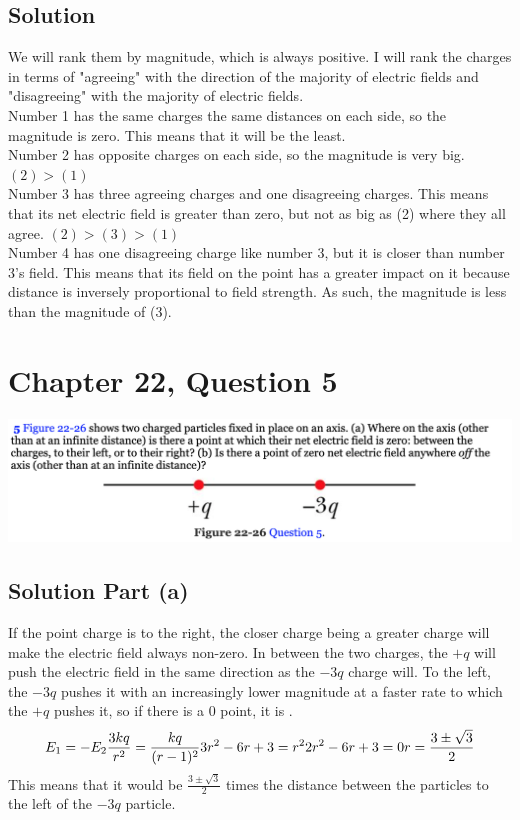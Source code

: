 \documentclass[12pt]{article}
\begin{document}
\subsection*{Solution}
We will rank them by magnitude, which is always positive. I will rank the charges in terms of "agreeing" with the direction of the majority of electric fields and "disagreeing" with the majority of electric fields.\\
Number 1 has the same charges the same distances on each side, so the magnitude is zero. This means that it will be the least.\\
Number 2 has opposite charges on each side, so the magnitude is very big. $(2) > (1)$\\
Number 3 has three agreeing charges and one disagreeing charges. This means that its net electric field is greater than zero, but not as big as (2) where they all agree. $(2) > (3) > (1)$\\
Number 4 has one disagreeing charge like number 3, but it is closer than number 3's field. This means that its field on the point has a greater impact on it because distance is inversely proportional to field strength. As such, the magnitude is less than the magnitude of (3). 


\pagebreak
\section*{Chapter 22, Question 5}
\includegraphics[width=\textwidth]{picture_4.png}

\subsection*{Solution Part (a)}
If the point charge is to the right, the closer charge being a greater charge will make the electric field always non-zero. In between the two charges, the $+q$ will push the electric field in the same direction as the $-3q$ charge will. To the left, the $-3q$ pushes it with an increasingly lower magnitude at a faster rate to which the $+q$ pushes it, so if there is a 0 point, it is .
\begin{equation*}
    E_1 = -E_2\\
    \frac{3kq}{r^2} = \frac{kq}{(r - 1)^2}\\
    3r^2 - 6r + 3 = r^2\\
    2r^2 - 6r + 3 = 0\\
    r = \frac{3 \pm \sqrt{3}}{2}
\end{equation*}
This means that it would be $\frac{3 \pm \sqrt{3}}{2}$ times the distance between the particles to the left of the $-3q$ particle.
\end{document}
